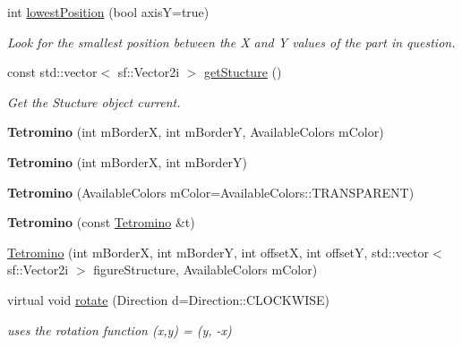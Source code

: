 \begin{DoxyCompactItemize}
\item 
int \hyperlink{classTetromino_aa77965d8aa40ea448b5e8c5e288910d0}{lowest\+Position} (bool axisY=true)
\begin{DoxyCompactList}\small\item\em Look for the smallest position between the X and Y values of the part in question. \end{DoxyCompactList}\item 
const std\+::vector$<$ sf\+::\+Vector2i $>$ \hyperlink{classTetromino_abbad824f47a492bdc96810908903c7ac}{get\+Stucture} ()
\begin{DoxyCompactList}\small\item\em Get the Stucture object current. \end{DoxyCompactList}\item 
\mbox{\label{classTetromino_a16b078d3e8a3b75cf0e22aa64c46af5e}} 
{\bfseries Tetromino} (int m\+BorderX, int m\+BorderY, Available\+Colors m\+Color)
\item 
\mbox{\label{classTetromino_aeca0a1fc3b172f3545f8775e235d2d14}} 
{\bfseries Tetromino} (int m\+BorderX, int m\+BorderY)
\item 
\mbox{\label{classTetromino_a24fb8d502facca047e5e192cbc68a5ee}} 
{\bfseries Tetromino} (Available\+Colors m\+Color=Available\+Colors\+::\+T\+R\+A\+N\+S\+P\+A\+R\+E\+NT)
\item 
\mbox{\label{classTetromino_ac87bbdae1c3c8349081f41327c0b4afb}} 
{\bfseries Tetromino} (const \hyperlink{classTetromino}{Tetromino} \&t)
\item 
\hyperlink{classTetromino_ab2a8b2460d6acaf098cdc257630cd182}{Tetromino} (int m\+BorderX, int m\+BorderY, int offsetX, int offsetY, std\+::vector$<$ sf\+::\+Vector2i $>$ figure\+Structure, Available\+Colors m\+Color)
\item 
virtual void \hyperlink{classTetromino_ac1de8d2bbc2e46ee5d5586f25dcd4692}{rotate} (Direction d=Direction\+::\+C\+L\+O\+C\+K\+W\+I\+SE)
\begin{DoxyCompactList}\small\item\em uses the rotation function (x,y) = (y, -\/x) \end{DoxyCompactList}\item 
\mbox{\label{classTetromino_a79f30c3dd8ea432e0bc5d7d2108e5a17}} 

\end{DoxyCompactItemize}
